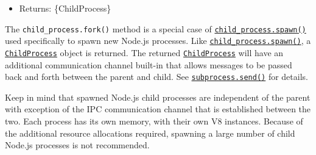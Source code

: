 \begin{itemize}
\begin{itemize}
    \texttt{\textquotesingle{}inherit\textquotesingle{}} options for
    \hyperref[child_processspawncommand-args-options]{\texttt{child\_process.spawn()}}'s
    \hyperref[optionsstdio]{\texttt{stdio}} for more details.
    \textbf{Default:} \texttt{false}.
  \item
    \texttt{stdio} \{Array\textbar string\} See
    \hyperref[child_processspawncommand-args-options]{\texttt{child\_process.spawn()}}'s
    \hyperref[optionsstdio]{\texttt{stdio}}. When this option is
    provided, it overrides \texttt{silent}. If the array variant is
    used, it must contain exactly one item with value
    \texttt{\textquotesingle{}ipc\textquotesingle{}} or an error will be
    thrown. For instance
    \texttt{{[}0,\ 1,\ 2,\ \textquotesingle{}ipc\textquotesingle{}{]}}.
  \item
    \texttt{uid} \{number\} Sets the user identity of the process (see
    setuid(2)).
  \item
    \texttt{windowsVerbatimArguments} \{boolean\} No quoting or escaping
    of arguments is done on Windows. Ignored on Unix. \textbf{Default:}
    \texttt{false}.
  \item
    \texttt{timeout} \{number\} In milliseconds the maximum amount of
    time the process is allowed to run. \textbf{Default:}
    \texttt{undefined}.
  \end{itemize}
\item
  Returns: \{ChildProcess\}
\end{itemize}

The \texttt{child\_process.fork()} method is a special case of
\hyperref[child_processspawncommand-args-options]{\texttt{child\_process.spawn()}}
used specifically to spawn new Node.js processes. Like
\hyperref[child_processspawncommand-args-options]{\texttt{child\_process.spawn()}},
a \hyperref[class-childprocess]{\texttt{ChildProcess}} object is
returned. The returned
\hyperref[class-childprocess]{\texttt{ChildProcess}} will have an
additional communication channel built-in that allows messages to be
passed back and forth between the parent and child. See
\hyperref[subprocesssendmessage-sendhandle-options-callback]{\texttt{subprocess.send()}}
for details.

Keep in mind that spawned Node.js child processes are independent of the
parent with exception of the IPC communication channel that is
established between the two. Each process has its own memory, with their
own V8 instances. Because of the additional resource allocations
required, spawning a large number of child Node.js processes is not
recommended.


